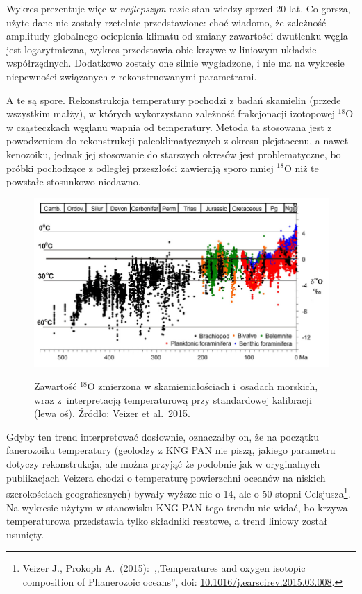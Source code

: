 \documentclass[12pt]{article}
\newcommand{\doi}[1]{doi: \href{htts://doi.org/#1}{#1}}
\begin{document}
Wykres prezentuje więc w \emph{najlepszym} razie stan wiedzy sprzed 20 lat. Co gorsza, użyte dane nie zostały rzetelnie przedstawione: choć wiadomo, że zależność amplitudy globalnego ocieplenia klimatu od zmiany zawartości dwutlenku węgla jest logarytmiczna, wykres przedstawia obie krzywe w liniowym układzie współrzędnych. Dodatkowo zostały one silnie wygładzone, i nie ma na wykresie niepewności związanych z rekonstruowanymi parametrami.

A te są spore. Rekonstrukcja temperatury pochodzi z badań skamielin (przede wszystkim małży), w których wykorzystano zależność frakcjonacji izotopowej $^{18}$O w cząsteczkach węglanu wapnia od temperatury. Metoda ta stosowana jest z powodzeniem do rekonstrukcji paleoklimatycznych z okresu plejstocenu, a nawet kenozoiku, jednak jej stosowanie do starszych okresów jest problematyczne, bo próbki pochodzące z odległej przeszłości zawierają sporo mniej $^{18}$O niż te powstałe stosunkowo niedawno.

\begin{figure}
	\centering
	\includegraphics[width=.95\textwidth]{img/veizer2015.png}

\smallskip\noindent\small Zawartość $^{18}$O zmierzona w skamieniałościach i~osadach morskich, wraz z~interpretacją temperaturową przy standardowej kalibracji (lewa oś). Źródło: Veizer et al.~2015.
\end{figure}


Gdyby ten trend interpretować dosłownie, oznaczałby on, że na początku fanerozoiku temperatury (geolodzy z KNG PAN nie piszą, jakiego parametru dotyczy rekonstrukcja, ale można przyjąć że podobnie jak w oryginalnych publikacjach Veizera chodzi o temperaturę powierzchni oceanów na niskich szerokościach geograficznych) bywały wyższe nie o 14, ale o 50 stopni Celsjusza\footnote{Veizer J., Prokoph A.~(2015):~,,Temperatures and oxygen isotopic composition of Phanerozoic oceans'', \doi{10.1016/j.earscirev.2015.03.008}.}. Na wykresie użytym w stanowisku KNG PAN tego trendu nie widać, bo krzywa temperaturowa przedstawia tylko składniki resztowe, a trend liniowy został usunięty. 
	
\end{document}
